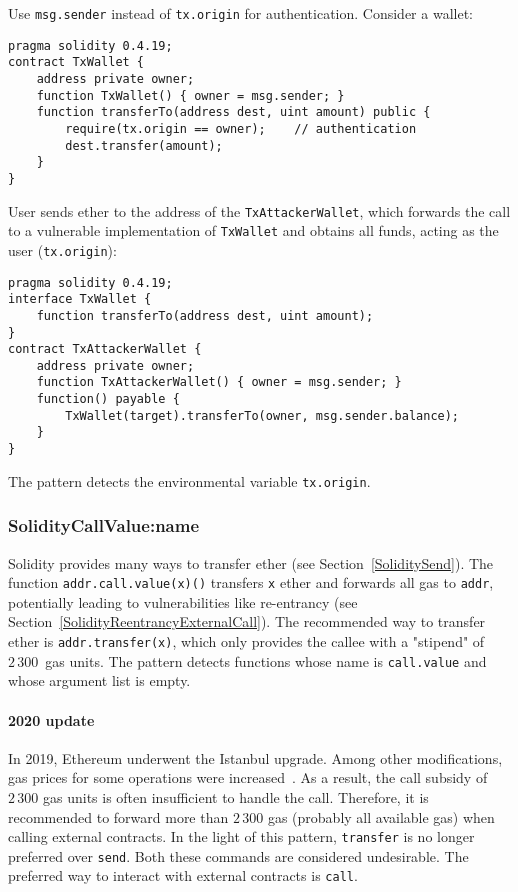 Use \texttt{msg.sender} instead of \texttt{tx.origin} for authentication.
Consider a wallet:

\begin{lstlisting}[language=Solidity]
pragma solidity 0.4.19;
contract TxWallet {
    address private owner;
    function TxWallet() { owner = msg.sender; }
    function transferTo(address dest, uint amount) public {
        require(tx.origin == owner);	// authentication
        dest.transfer(amount);
    }
}
\end{lstlisting}

User sends ether to the address of the \texttt{TxAttackerWallet}, which forwards the call to a vulnerable implementation of \texttt{TxWallet} and obtains all funds, acting as the user (\texttt{tx.origin}):

\begin{lstlisting}[language=Solidity]
pragma solidity 0.4.19;
interface TxWallet {
    function transferTo(address dest, uint amount);
}
contract TxAttackerWallet {
    address private owner;
    function TxAttackerWallet() { owner = msg.sender; }
    function() payable {
        TxWallet(target).transferTo(owner, msg.sender.balance);
    }
}
\end{lstlisting}

The pattern detects the environmental variable \texttt{tx.origin}.

\subsubsection{\let\letcs\texapiletcs \usevalue SolidityCallValue:name \let\letcs\etoolboxletcs} \label{SolidityCallValue}

Solidity provides many ways to transfer ether (see Section~\ref{SoliditySend}).
The function \texttt{addr.call.value(x)()} transfers \texttt{x} ether and forwards all gas to \texttt{addr}, potentially leading to vulnerabilities like re-entrancy (see Section~\ref{SolidityReentrancyExternalCall}).
The recommended way to transfer ether is \texttt{addr.transfer(x)}, which only provides the callee with a "stipend" of $2\,300$~gas units.
The pattern detects functions whose name is \texttt{call.value} and whose argument list is empty.

\paragraph{2020 update}
In 2019, Ethereum underwent the Istanbul upgrade.
Among other modifications, gas prices for some operations were increased~\cite{EIP1884}.
As a result, the call subsidy of~$2\,300$ gas units is often insufficient to handle the call.
Therefore, it is recommended to forward more than $2\,300$ gas (probably all available gas) when calling external contracts.
In the light of this pattern, \texttt{transfer} is no longer preferred over \texttt{send}.
Both these commands are considered undesirable.
The preferred way to interact with external contracts is \texttt{call}.


